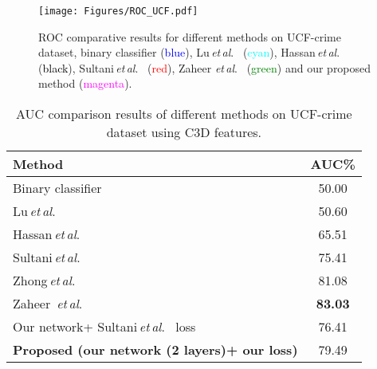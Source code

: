 \documentclass[journal]{IEEEtran}
\newcommand{\authorcite}{{\textit{et}\,\textit{al}.}}
\begin{document}
\begin{figure}
\centering
\texttt{[image: Figures/ROC\_UCF.pdf]}
	\caption{ROC comparative results for different methods on UCF-crime dataset, binary classifier (\textcolor{blue}{blue}), Lu\,\authorcite~\cite{lu2013abnormal} (\textcolor{cyan}{cyan}), Hassan\,\authorcite~\cite{hasan2016learning} (\textcolor{black}{black}), Sultani\,\authorcite~\cite{sultani2018real} (\textcolor{red}{red}), Zaheer \authorcite~\cite{zaheer2020claws} (\textcolor{green}{green}) and our proposed method (\textcolor{magenta}{magenta}).}
	\label{Fig:ROC_curve}
\end{figure}
\begin{table}[ht]
	\label{tab:ROC_curve}
	\centering
	\caption{AUC comparison results of different methods on UCF-crime dataset using C3D features.}	
\begin{tabular}[t]{lc}
		\toprule
		Method& AUC\%\\ \midrule
		Binary classifier &50.00 \\
		
		Lu\,\authorcite~\cite{lu2013abnormal} &50.60 \\
		
		Hassan\,\authorcite~\cite{hasan2016learning} &65.51 \\
		
		Sultani\,\authorcite~\cite{sultani2018real} & 75.41\\
		Zhong\,\authorcite~\cite{Zhong_2019_CVPR}& 81.08\\
		Zaheer~\authorcite~\cite{zaheer2020claws}&\textbf{83.03}\\
		\midrule
		Our network+ Sultani\,\authorcite~\cite{sultani2018real} loss & 76.41\\
		
		\textbf{Proposed (our network (2 layers)+ our loss)} & 79.49\\
\bottomrule
	\end{tabular}	
	\label{Tab:AUC results}
\end{table}
\end{document}

